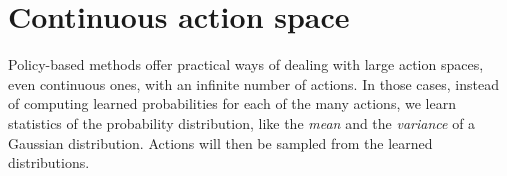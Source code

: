 \section{Continuous action space}
Policy-based methods offer practical ways of dealing with large action spaces, even continuous ones, with an infinite number of actions. In those cases, instead of computing learned probabilities for each of the many actions, we learn statistics of the probability distribution, like the \textit{mean} and the \textit{variance} of a Gaussian distribution. Actions will then be sampled from the learned distributions.